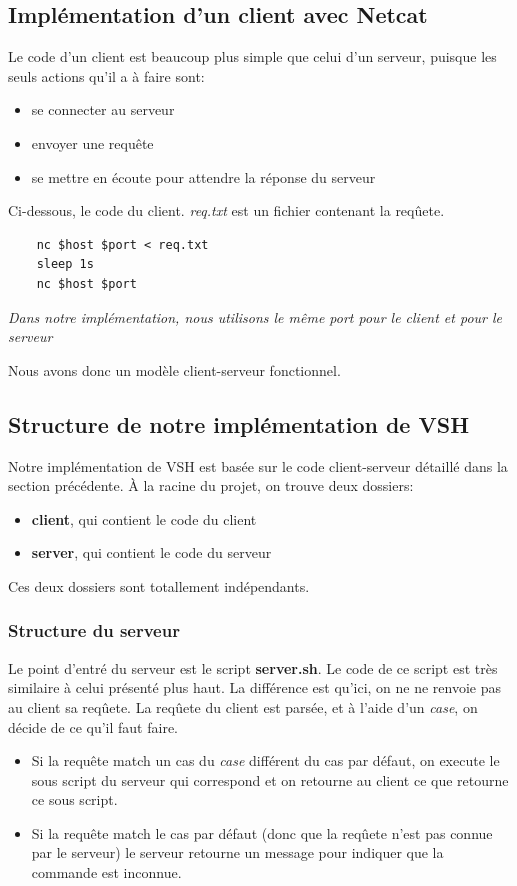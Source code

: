 \documentclass[titlepage]{article}
\begin{document}
	\subsection{Implémentation d'un client avec Netcat}
	Le code d'un client est beaucoup plus simple que celui d'un serveur, puisque les seuls actions qu'il a à faire sont:
	\begin{itemize}  
		\item se connecter au serveur 
		\item envoyer une requête
		\item se mettre en écoute pour attendre la réponse du serveur
	\end{itemize}

	Ci-dessous, le code du client. \textit{req.txt} est un fichier contenant la reqûete. 

	\begin{lstlisting}
	nc $host $port < req.txt
	sleep 1s
	nc $host $port
	\end{lstlisting}

	\textit{Dans notre implémentation, nous utilisons le même port pour le client et pour le serveur} 

	Nous avons donc un modèle client-serveur fonctionnel.

	\subsection{Structure de notre implémentation de VSH}
	Notre implémentation de VSH est basée sur le code client-serveur détaillé dans la section précédente.
	À la racine du projet, on trouve deux dossiers:
	\begin{itemize}  
		\item \textbf{client}, qui contient le code du client 
		\item \textbf{server}, qui contient le code du serveur
	\end{itemize}
	Ces deux dossiers sont totallement indépendants.

	\subsubsection{Structure du serveur}
	Le point d'entré du serveur est le script \textbf{server.sh}. Le code de ce script est très similaire à celui présenté plus haut. La différence est qu'ici, on ne ne renvoie pas au client sa reqûete. La reqûete du client est parsée, et à l'aide d'un \textit{case}, on décide de ce qu'il faut faire.
	\begin{itemize}  
		\item Si la requête match un cas du \textit{case} différent du cas par défaut, on execute le sous script du serveur qui correspond et on retourne au client ce que retourne ce sous script.
		\item Si la requête match le cas par défaut (donc que la reqûete n'est pas connue par le serveur) le serveur retourne un message pour indiquer que la commande est inconnue.
	\end{itemize}
\end{document}
